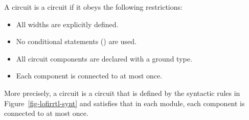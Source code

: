 A {\firrtl}  circuit is a {\lofirrtl} circuit if it obeys the following restrictions:
\begin{itemize}
\item All widths are explicitly defined.
\item No conditional statements () are used.
\item All circuit components are declared with a ground type.
\item Each component is connected to at most once.
\end{itemize}
More precisely, a {\lofirrtl} circuit is a {\firrtl}  circuit that is defined by the syntactic rules in Figure~\ref{fig-lofirrtl-synt}
and satisfies that in each module, each component is connected to at most once.


